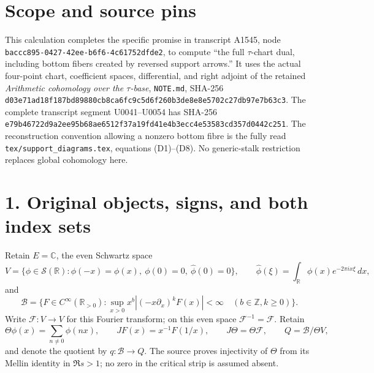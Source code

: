 


\section{Scope and source pins}\label{TranscriptStage:proof03:scope-and-source-pins}

This calculation completes the specific promise in transcript A1545,
node \texttt{baccc895-\allowbreak{}0427-\allowbreak{}42ee-\allowbreak{}b6f6-\allowbreak{}4c61752dfde2}, to compute ``the
full \ensuremath{\tau}-chart dual, including bottom fibers created by reversed support
arrows.'' It uses the actual four-point chart, coefficient spaces,
differential, and right adjoint of the retained \emph{Arithmetic
cohomology over the \ensuremath{\tau}-base}, \texttt{NOTE.md}, SHA-256
\texttt{d03e71ad\allowbreak{}18f187bd\allowbreak{}89880cb8\allowbreak{}ca6fc9c5\allowbreak{}d6f260b3\allowbreak{}de8e8e57\allowbreak{}02c27db9\allowbreak{}7e7b63c3}.
The complete transcript segment U0041--U0054 has SHA-256
\texttt{e79b4672\allowbreak{}2d9a2ee9\allowbreak{}5b68ae65\allowbreak{}12f37a19\allowbreak{}fd41e4b3\allowbreak{}ecc4e535\allowbreak{}83cd357d\allowbreak{}0442c251}.
The reconstruction convention allowing a nonzero bottom fibre is the
fully read \texttt{tex/\allowbreak{}support\_\allowbreak{}diagrams.tex}, equations (D1)--(D8). No
generic-stalk restriction replaces global cohomology here.

\section{1. Original objects, signs, and both index
sets}\label{TranscriptStage:proof03:original-objects-signs-and-both-index-sets}

Retain \(E=\mathbb C\), the even Schwartz space \[
V=\{\phi\in\mathcal S(\mathbb R):\phi(-x)=\phi(x),\ \phi(0)=0,\ \widehat\phi(0)=0\},
\qquad
\widehat\phi(\xi)=\int_{\mathbb R}\phi(x)e^{-2\pi i x\xi}\,dx,
\] and \[
\mathscr B=\{F\in C^\infty(\mathbb R_{>0}):
\sup_{x>0}x^b|(-x\partial_x)^kF(x)|<\infty\quad(b\in\mathbb Z,k\ge0)\}.
\] Write \(\mathcal F:V\to V\) for this Fourier transform; on this even
space \(\mathcal F^{-1}=\mathcal F\). Retain \[
\Theta\phi(x)=\sum_{n\ne0}\phi(nx),\qquad
JF(x)=x^{-1}F(1/x),\qquad J\Theta=\Theta\mathcal F,
\qquad Q=\mathscr B/\Theta V,
\] and denote the quotient by \(q:\mathscr B\to Q\). The source proves
injectivity of \(\Theta\) from its Mellin identity in \(\Re s>1\); no
zero in the critical strip is assumed absent.


